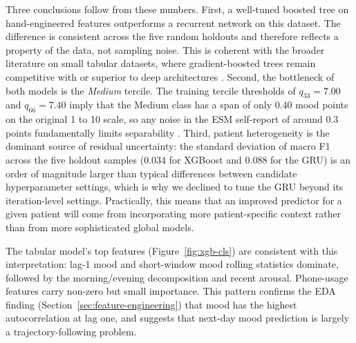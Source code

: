 Three conclusions follow from these numbers. First, a well-tuned boosted tree on hand-engineered features outperforms a recurrent network on this dataset. The difference is consistent across the five random holdouts and therefore reflects a property of the data, not sampling noise. This is coherent with the broader literature on small tabular datasets, where gradient-boosted trees remain competitive with or superior to deep architectures \cite{grinsztajn2022tabular}. Second, the bottleneck of both models is the \textit{Medium} tercile. The training tercile thresholds of $q_{33}=7.00$ and $q_{66}=7.40$ imply that the Medium class has a span of only $0.40$ mood points on the original 1 to 10 scale, so any noise in the ESM self-report of around $0.3$ points fundamentally limits separability \cite{conner2007experience}. Third, patient heterogeneity is the dominant source of residual uncertainty: the standard deviation of macro F1 across the five holdout samples ($0.034$ for XGBoost and $0.088$ for the GRU) is an order of magnitude larger than typical differences between candidate hyperparameter settings, which is why we declined to tune the GRU beyond its iteration-level settings. Practically, this means that an improved predictor for a given patient will come from incorporating more patient-specific context rather than from more sophisticated global models.

The tabular model's top features (Figure~\ref{fig:xgb-cls}) are consistent with this interpretation: lag-1 mood and short-window mood rolling statistics dominate, followed by the morning/evening decomposition and recent arousal. Phone-usage features carry non-zero but small importance. This pattern confirms the EDA finding (Section~\ref{sec:feature-engineering}) that mood has the highest autocorrelation at lag one, and suggests that next-day mood prediction is largely a trajectory-following problem.
